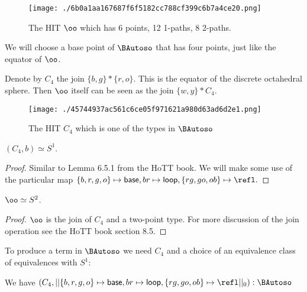 \begin{figure}
\centering
\begin{minipage}[t]{0.45\linewidth}
\centering
\end{minipage}
\hfill
\begin{minipage}[t]{0.45\linewidth}
\texttt{[image: ./6b0a1aa167687f6f5182cc788cf399c6b7a4ce20.png]}
\end{minipage}
\caption{The HIT \(\oo\) which has 6 points, 12 1-paths, 8 2-paths.}
\end{figure}

We will choose a base point of \(\BAutoso\) that has four points, just
like the equator of \(\oo\).

\begin{mydef}
Denote by \( C_4 \) the join \( \{b, g\}*\{r, o\} \). This is the equator of the discrete octahedral sphere. Then \( \oo \) itself can be seen as the join \( \{w, y\}* C_4 \).
\end{mydef}

\begin{figure}
\centering
\begin{minipage}[t]{0.45\linewidth}
\centering
\end{minipage}
\hfill
\begin{minipage}[t]{0.45\linewidth}
\texttt{[image: ./45744937ac561c6ce05f971621a980d63ad6d2e1.png]}
\end{minipage}
\caption{The HIT \(C_4\) which is one of the types in \(\BAutoso\)}
\end{figure}

\begin{mylemma}
\( (C_4, b)\simeq S^1 \).
\end{mylemma}

\emph{Proof.} Similar to Lemma 6.5.1 from the HoTT book\cite{hottbook}.
We will make some use of the particular map
\(\{b, r, g, o\}\mapsto \mathsf{base}, br\mapsto \mathsf{loop}, \{rg, go, ob\}\mapsto \refl.\)~◻

\begin{mylemma}
\( \oo\simeq S^2 \).
\end{mylemma}

\emph{Proof.} \(\oo\) is the join of \(C_4\) and a two-point type. For
more discussion of the join operation see the HoTT book section
8.5\cite{hottbook}.~◻

To produce a term in \(\BAutoso\) we need \(C_4\) and a choice of an
equivalence class of equivalences with \(S^1\):

\begin{mylemma}
We have \( (C_4, ||\{b, r, g, o\}\mapsto \mathsf{base}, br\mapsto \mathsf{loop}, \{rg, go, ob\}\mapsto \refl ||_0):\BAutoso \)
\end{mylemma}

